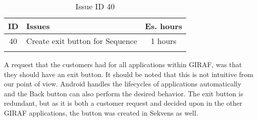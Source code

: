 \begin{longtable} { | c | p{12cm} | c | } 
\hline
	ID 	&	Issues	&		 Es. hours \\\hline
	40	&	Create exit button for Sequence	&	1 hours \\\hline
\caption{Issue ID 40}
\label{tab:spr3_createexitbutton}
\end{longtable}

A request that the customers had for all applications within GIRAF, was that they should have an exit button. It should be noted that this is not intuitive from our point of view. Android handles the lifecycles of applications automatically\cite{Lifecycle} and the Back button can also perform the desired behavior. The exit button is redundant, but as it is both a customer request and decided upon in the other GIRAF applications, the button was created in Sekvens as well.
